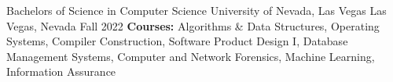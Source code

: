 
\begin{cventries}

  \cventry
    {Bachelors of Science in Computer Science} %
    {University of Nevada, Las Vegas}%
    {Las Vegas, Nevada} %
    {Fall 2022} %
    {\textbf{Courses: }Algorithms \& Data Structures, Operating Systems, Compiler Construction, Software Product Design I, Database Management Systems, Computer and Network Forensics, Machine Learning, Information Assurance}
\end{cventries}
